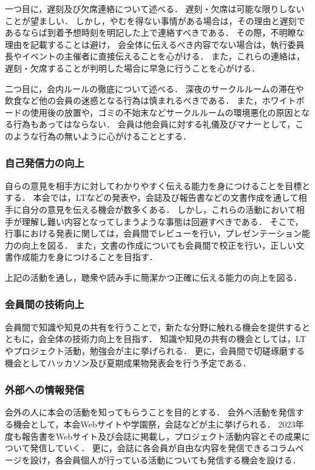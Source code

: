 一つ目に，遅刻及び欠席連絡について述べる．
遅刻・欠席は可能な限りしないことが望ましい．
しかし，やむを得ない事情がある場合は，その理由と遅刻であるならば到着予想時刻を明記した上で連絡すべきである．
その際，不明瞭な理由を記載することは避け，
会全体に伝えるべき内容でない場合は，執行委員長やイベントの主催者に直接伝えることを心がける．
また，これらの連絡は，遅刻・欠席することが判明した場合に早急に行うことを心がける．

二つ目に，会内ルールの徹底について述べる．
深夜のサークルルームの滞在や飲食など他の会員の迷惑となる行為は慎まれるべきである．
また，ホワイトボードの使用後の放置や，ゴミの不始末などサークルルームの環境悪化の原因となる行為もあってはならない．
会員は他会員に対する礼儀及びマナーとして，このような行為の無いように心がけることとする．

\subsubsection*{自己発信力の向上}
自らの意見を相手方に対してわかりやすく伝える能力を身につけることを目標とする．
本会では，LTなどの発表や，会誌及び報告書などの文書作成を通して相手に自分の意見を伝える機会が数多くある．
しかし，これらの活動において相手が理解し難い内容となってしまうような事態は回避すべきである．
そこで，行事における発表に関しては，会員間でレビューを行い，プレゼンテーション能力の向上を図る．
また，文書の作成についても会員間で校正を行い，正しい文書作成能力を身につけることを目指す．

上記の活動を通し，聴衆や読み手に簡潔かつ正確に伝える能力の向上を図る．

\subsubsection*{会員間の技術向上}
会員間で知識や知見の共有を行うことで，新たな分野に触れる機会を提供するとともに，会全体の技術力向上を目指す．
知識や知見の共有の機会としては，LTやプロジェクト活動，勉強会が主に挙げられる．
更に，会員間で切磋琢磨する機会としてハッカソン及び夏期成果物発表会を行う予定である．

\subsubsection*{外部への情報発信}
会外の人に本会の活動を知ってもらうことを目的とする．
会外へ活動を発信する機会として，本会Webサイトや学園祭，会誌などが主に挙げられる．
2023年度も報告書をWebサイト及び会誌に掲載し，プロジェクト活動内容とその成果について発信していく．
更に，会誌に各会員が自由な内容を発信できるコラムページを設け，各会員個人が行っている活動についても発信する機会を設ける．

